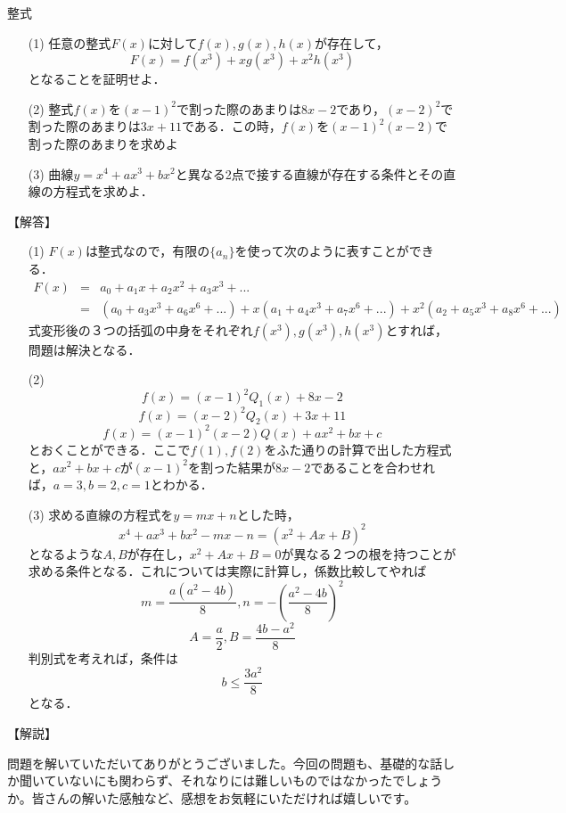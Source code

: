 \documentclass[a4paper,fleqn,dvipdfmx]{jsarticle}
\begin{document}
\newpage
\begin{itembox}[l]{整式}
\begin{itemize}
    \item [(1)] 
    任意の整式$F(x)$に対して$f(x),g(x),h(x)$が存在して，    $$F(x)=f(x^3)+xg(x^3)+x^2h(x^3)$$    となることを証明せよ．
    \item[(2)]
    整式$f(x)$を$(x-1)^2$で割った際のあまりは$8x-2$であり，$(x-2)^2$で割った際のあまりは$3x+11$である．この時，$f(x)$を$(x-1)^2(x-2)$で割った際のあまりを求めよ
    \item[(3)]
    曲線$y=x^4+ax^3+bx^2$と異なる2点で接する直線が存在する条件とその直線の方程式を求めよ．
\end{itemize}
\end{itembox}

\begin{flushleft}
【解答】
\end{flushleft}

\begin{itemize}
    \item [(1)] $F(x)$は整式なので，有限の$\{a_n\}$を使って次のように表すことができる．
    \begin{eqnarray}
        F(x)&=&a_0+a_1x+a_2x^2+a_3x^3+...\\ &=&(a_0+a_3x^3+a_6x^6+...)+x(a_1+a_4x^3+a_7x^6+...)+x^2(a_2+a_5x^3+a_8x^6+...)
    \end{eqnarray}
    式変形後の３つの括弧の中身をそれぞれ$f(x^3),g(x^3),h(x^3)$とすれば，問題は解決となる．
    \item [(2)] $$f(x)=(x-1)^2Q_1(x)+8x-2$$
    $$f(x)=(x-2)^2Q_2(x)+3x+11$$
    $$f(x)=(x-1)^2(x-2)Q(x)+ax^2+bx+c$$
    とおくことができる．ここで$f(1),f(2)$をふた通りの計算で出した方程式と，$ax^2+bx+c$が$(x-1)^2$を割った結果が$8x-2$であることを合わせれば，$a=3,b=2,c=1$とわかる．
    \item [(3)] 求める直線の方程式を$y=mx+n$とした時，$$x^4+ax^3+bx^2-mx-n=(x^2+Ax+B)^2$$となるような$A,B$が存在し，$x^2+Ax+B=0$が異なる２つの根を持つことが求める条件となる．これについては実際に計算し，係数比較してやれば
    $$m=\frac{a(a^2-4b)}{8},n=-\left (\frac{a^2-4b}{8}\right )^2$$
    $$A=\frac{a}{2},B=\frac{4b-a^2}{8}$$
    判別式を考えれば，条件は
    $$b\leq \frac{3a^2}{8}$$
    となる．
\end{itemize}

\begin{flushleft}
    【解説】
\end{flushleft}

問題を解いていただいてありがとうございました。今回の問題も、基礎的な話しか聞いていないにも関わらず、それなりには難しいものではなかったでしょうか。皆さんの解いた感触など、感想をお気軽にいただければ嬉しいです。
\end{document}
